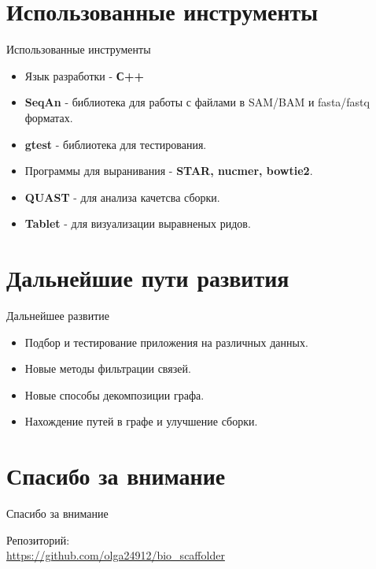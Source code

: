 \documentclass{beamer}
\newcommand{\cimg}[2]{%
	\begin{center}%
		\ifthenelse{\equal{#2}{}}{%
			\texttt{[image: \#1]}
		}{%
			\texttt{[image: \#1]}
		}%
	\end{center}%
}
\begin{document}
\section{Использованные инструменты}
\begin{frame}[t]{Использованные инструменты}
\begin{itemize}
	\item Язык разработки - \textbf{С++}
	\item \textbf{SeqAn} - библиотека для работы с 
	файлами в SAM/BAM и fasta/fastq форматах.  
	\item \textbf{gtest} - библиотека для тестирования.
	\item Программы для выранивания - \textbf{STAR, nucmer, bowtie2}. 
	\item \textbf{QUAST} - для анализа качетсва сборки. 
	\item \textbf{Tablet} - для визуализации выравненых ридов. 
\end{itemize}
\end{frame}

\section{Дальнейшие пути развития}
\begin{frame}[t]{Дальнейшее развитие}
	\begin{itemize}
		\item Подбор и тестирование 
		приложения на различных 
		данных.  
		\cimg{athaliana.jpg}{0.20}
		
		\item Новые методы фильтрации связей.  
		
		\item Новые способы декомпозиции графа. 
		
		\item Нахождение путей в графе и улучшение сборки. 
	\end{itemize}
\end{frame}

\section{Спасибо за внимание}
\begin{frame}{Спасибо за внимание}
    \begin{center}
        Репозиторий: \\ \url{https://github.com/olga24912/bio_scaffolder}
    \end{center}
\end{frame}
\end{document}
